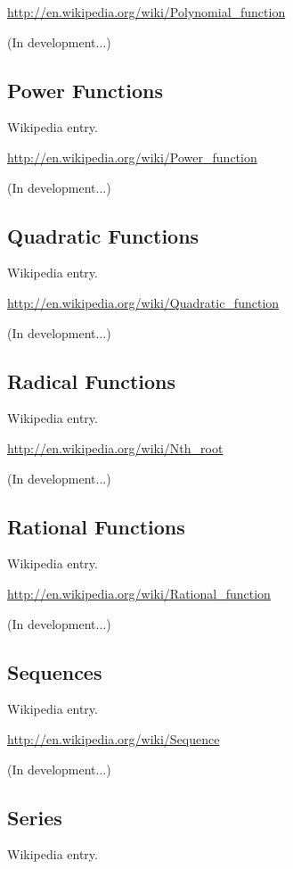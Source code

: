 \documentclass[12pt,twoside]{book}
\begin{document}
\href{http://en.wikipedia.org/wiki/Polynomial_function}{http://en.wikipedia.org/wiki/Polynomial\_function}

(In development...)

\subsection[Power Functions]{Power Functions}
Wikipedia entry.

\href{http://en.wikipedia.org/wiki/Power_function}{http://en.wikipedia.org/wiki/Power\_function}

(In development...)

\subsection[Quadratic Functions]{Quadratic
Functions}
Wikipedia entry.

\href{http://en.wikipedia.org/wiki/Quadratic_function}{http://en.wikipedia.org/wiki/Quadratic\_function}

(In development...)

\subsection[Radical Functions]{Radical Functions}
Wikipedia entry.

\href{http://en.wikipedia.org/wiki/Nth_root}{http://en.wikipedia.org/wiki/Nth\_root}

(In development...)

\subsection[Rational Functions]{Rational Functions}
Wikipedia entry.

\href{http://en.wikipedia.org/wiki/Rational_function}{http://en.wikipedia.org/wiki/Rational\_function}

(In development...)

\subsection[Sequences]{Sequences}
Wikipedia entry.

\href{http://en.wikipedia.org/wiki/Sequence}{http://en.wikipedia.org/wiki/Sequence}

(In development...)

\subsection[Series]{Series}
Wikipedia entry.
\end{document}
